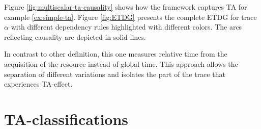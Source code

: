 Figure \ref{fig:multiscalar-ta-causality} shows how the framework captures TA for example \ref{ex:simple-ta}. Figure \ref{fig:ETDG} presents the complete ETDG for trace $\alpha$ with different dependency rules highlighted with different colors. The arcs reflecting causality are depicted in solid lines.

In contrast to other definition, this one measures relative time from the acquisition of the resource instead of global time. This approach allows the separation of different variations and isolates the part of the trace that experiences TA-effect.


\section{TA-classifications}

